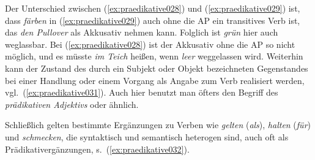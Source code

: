 \begin{exe}
  \ex\label{ex:praedikative027}
  \begin{xlist}
  \end{xlist}
\end{exe}

Der Unterschied zwischen (\ref{ex:praedikative028}) und (\ref{ex:praedikative029}) ist, dass \textit{färben} in (\ref{ex:praedikative029}) auch ohne die AP ein transitives Verb ist, das \textit{den Pullover} als Akkusativ nehmen kann.
Folglich ist \textit{grün} hier auch weglassbar.
Bei (\ref{ex:praedikative028}) ist der Akkusativ ohne die AP so nicht möglich, und es müsste \textit{im Teich} heißen, wenn \textit{leer} weggelassen wird.
Weiterhin kann der Zustand des durch ein Subjekt oder Objekt bezeichneten Gegenstandes bei einer Handlung oder einem Vorgang als Angabe zum Verb realisiert werden, vgl.\ (\ref{ex:praedikative031}).
Auch hier benutzt man öfters den Begriff des \textit{prädikativen Adjektivs} oder ähnlich.

\begin{exe}
\end{exe}

Schließlich gelten bestimmte Ergänzungen zu Verben wie \textit{gelten} (\textit{als}), \textit{halten} (\textit{für}) und \textit{schmecken}, die syntaktisch und semantisch heterogen sind, auch oft als Prädikativergänzungen, s.\ (\ref{ex:praedikative032}).

\begin{exe}
  \ex\label{ex:praedikative032}
  \begin{xlist}
  \end{xlist}
\end{exe}

